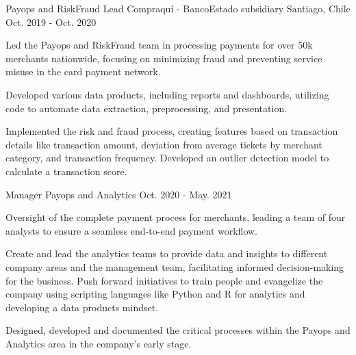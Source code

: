 \begin{cventries}
  \cventrytwopositions
    {Payops and RiskFraud Lead}
    {Compraquí - BancoEstado subsidiary}
    {Santiago, Chile}
    {Oct. 2019 - Oct. 2020}
    {
      \begin{cvitems}
	      \item {Led the Payops and RiskFraud team in processing payments for over 50k merchants nationwide, focusing on minimizing fraud and preventing service misuse in the card payment network.}
	      \item {Developed various data products, including reports and dashboards, utilizing code to automate data extraction, preprocessing, and presentation.}
	      \item {Implemented the risk and fraud process, creating features based on transaction details like transaction amount, deviation from average tickets by merchant category, and transaction frequency. Developed an outlier detection model to calculate a transaction score.}
      \end{cvitems}
    }
    {Manager Payops and Analytics}
    {Oct. 2020 - May. 2021}
    {
      \begin{cvitems}
        \item {Oversight of the complete payment process for merchants, leading a team of four analysts to ensure a seamless end-to-end payment workflow.}
        \item {Create and lead the analytics teams to provide data and insights to different company areas and the management team, facilitating informed decision-making for the business. Push forward initiatives to train people and evangelize the company using scripting languages like Python and R for analytics and developing a data products mindset.}
	\item {Designed, developed and documented the critical processes within the Payops and Analytics area in the company's early stage.}
      \end{cvitems}
    }
    

\end{cventries}
